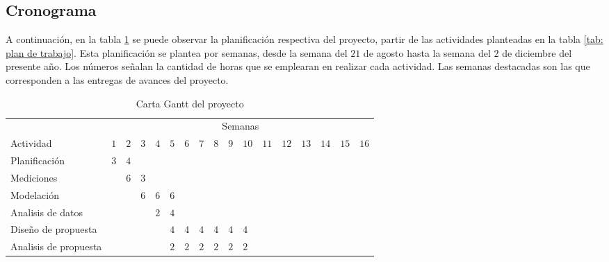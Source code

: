 \subsection{Cronograma}
\noindent A continuación, en la tabla \ref{tab: carta gantt} se puede observar la planificación respectiva del proyecto, partir de las actividades planteadas en la tabla \ref{tab: plan de trabajo}. Esta planificación se plantea por semanas, desde la semana del $21$ de agosto hasta la semana del $2$ de diciembre del presente año. Los números señalan la cantidad de horas que se emplearan en realizar cada actividad. Las semanas destacadas son las que corresponden a las entregas de avances del proyecto.
\begin{table}[H]
\centering
\caption{Carta Gantt del proyecto}
\label{tab: carta gantt}
\resizebox{16cm}{!} {
\begin{tabular}{|l|llllllllllllllll|}
\hline
 & \multicolumn{16}{c|}{Semanas} \\ \cline{2-17} 
\multirow{-2}{*}{Actividad} & $1$ & \cellcolor[HTML]{FABF8F}$2$ & $3$ & {\cellcolor[HTML]{FABF8F}$4$} & $5$ & $6$ & $7$ & {\cellcolor[HTML]{FABF8F}$8$} & $9$ & $10$ & \cellcolor[HTML]{FABF8F}$11$ & \multicolumn{1}{|l|}{$12$} & $13$ & $14$ & \cellcolor[HTML]{FABF8F}$15$ & \cellcolor[HTML]{FABF8F}$16$ \\ \hline
Planificación & \cellcolor[HTML]{4F81BD}$3$ & \cellcolor[HTML]{4F81BD}$4$ &  &  &  &  &  &  &  &  &  & \multicolumn{1}{|l|}{} &  &  &  &  \\
Mediciones &  & \cellcolor[HTML]{4F81BD}$6$ & {\cellcolor[HTML]{4F81BD}$3$} &  &  &  &  &  &  &  &  & \multicolumn{1}{|l|}{} &  &  &  &  \\
Modelación &  &  & {\cellcolor[HTML]{4F81BD}$6$} & {\cellcolor[HTML]{4F81BD}$6$} & \cellcolor[HTML]{4F81BD}$6$ &  &  &  &  &  &  & \multicolumn{1}{|l|}{} &  &  &  &  \\
Analisis de datos &  &  &  & {\cellcolor[HTML]{C0504D}$2$} & \cellcolor[HTML]{C0504D}$4$ &  &  &   &  &  &  & \multicolumn{1}{|l|}{} &  &  &  &  \\
Diseño de propuesta &  &  &  &  & \cellcolor[HTML]{C0504D}$4$ & \cellcolor[HTML]{C0504D}$4$ & \cellcolor[HTML]{C0504D}$4$ & {\cellcolor[HTML]{C0504D}$4$} & \cellcolor[HTML]{C0504D}$4$ & \cellcolor[HTML]{C0504D}$4$ &  & \multicolumn{1}{|l|}{} &  &  &  &  \\
Analisis de propuesta &  &  &  &  & \cellcolor[HTML]{C0504D}$2$ & \cellcolor[HTML]{C0504D}$2$ & \cellcolor[HTML]{C0504D}$2$ & {\cellcolor[HTML]{C0504D}$2$} & \cellcolor[HTML]{C0504D}$2$ & \cellcolor[HTML]{C0504D}$2$ &  & \multicolumn{1}{|l|}{} &  &  &  &  \\

\end{tabular}}
\end{table}
